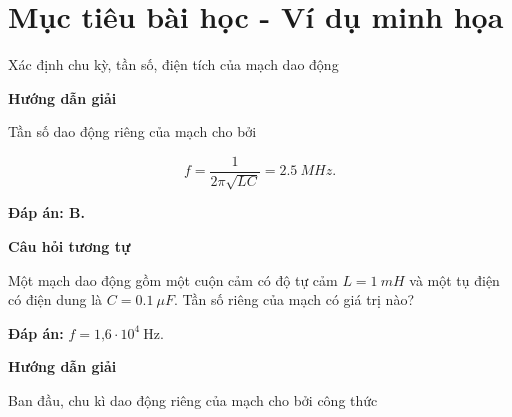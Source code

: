 \section{Mục tiêu bài học - Ví dụ minh họa}
\begin{dang}{Xác định chu kỳ, tần số, điện tích của mạch dao động}
	{	\begin{center}
			\textbf{Hướng dẫn giải}
		\end{center}
		
		
		Tần số dao động riêng của mạch cho bởi
		
		$$f = \dfrac{1}{2\pi \sqrt{LC}} = \SI{2,5}{MHz}.$$
		
		\textbf{Đáp án: B.}
	
		
		\begin{center}
			\textbf{Câu hỏi tương tự}
		\end{center}
		
	Một mạch dao động gồm một cuộn cảm có độ tự cảm $L = \SI{1}{mH}$ và một tụ điện có điện dung là $C = \SI{0,1}{\mu F}$. Tần số riêng của mạch có giá trị nào?
		
		\textbf{Đáp án:} $f = \text{1,6}\cdot 10^4\ \text{Hz}$.
	}
{	\begin{center}
		\textbf{Hướng dẫn giải}
	\end{center}
	
	Ban đầu, chu kì dao động riêng của mạch cho bởi công thức 
	
}
\end{dang}
